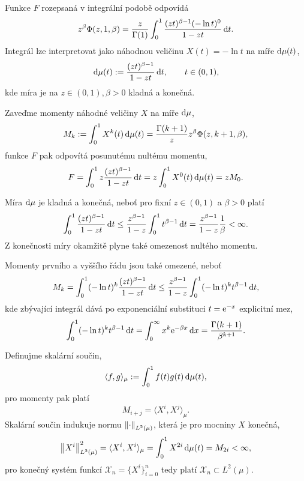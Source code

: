 Funkce $F$ rozepsaná v integrální podobě odpovídá
\begin{equation}
    z^\beta\Phi(z,1,\beta)=\frac{z}{\Gamma(1)}\int_0^1 \frac{(zt)^{\beta-1}(-\ln{t})^{0}}{1-zt}\,\mathrm{d}{t}.
\end{equation}
Integrál lze interpretovat jako náhodnou veličinu $X(t)=-\ln{t}$ na míře $\!\,\mathrm{d}{\mu}(t)$,
\begin{equation}
    \,\mathrm{d}{\mu}(t) := \frac{(zt)^{\beta-1}}{1-zt}\,\mathrm{d}{t},\qquad t\in(0,1),
\end{equation}
kde míra je na $z\in(0,1), \beta >0$ kladná a konečná.

Zaveďme momenty náhodné veličiny $X$ na míře $\!\,\mathrm{d}{\mu}$,
\begin{equation}\label{eq:def_moment}
    M_k:=\int_0^1X^k(t)\,\mathrm{d}{\mu}(t)=\frac{\Gamma(k+1)}{z}z^\beta \Phi(z,k+1,\beta),
\end{equation}
funkce $F$ pak odpovítá posunutému nultému momentu,
\begin{equation}\label{eq:F_as_moment}
    F=\int_0^1 z\frac{(zt)^{\beta-1}}{1-zt}\,\mathrm{d}{t}=z\int_0^1X^{0}(t)\,\mathrm{d}{\mu}(t)=zM_{0}.
\end{equation}

Míra $\!\,\mathrm{d}{\mu}$ je kladná a konečná, neboť pro fixní $z\in(0,1)$ a $\beta>0$ platí
\begin{equation}
    \int_0^1\frac{(zt)^{\beta-1}}{1-zt} \,\mathrm{d}{t} \leq \frac{z^{\beta-1}}{1-z}\int_0^1t^{\beta-1}\,\mathrm{d}{t}=\frac{z^{\beta-1}}{1-z}\frac{1}{\beta}<\infty.
\end{equation}
Z konečnosti míry okamžitě plyne také omezenost nultého momentu.

Momenty prvního a vyššího řádu jsou také omezené, neboť 
\begin{equation}
    M_k=\int_0^1(-\ln{t})^k\frac{(zt)^{\beta-1}}{1-zt}\,\mathrm{d}{t}\leq\frac{z^{\beta-1}}{1-z}\int_0^1(-\ln{t})^k t^{\beta-1}\,\mathrm{d}{t},
\end{equation}
kde zbývající integrál dává po exponenciální substituci $t=\mathrm{e}^{-x}$ explicitní mez,
\begin{equation}
    \int_0^1(-\ln{t})^k t^{\beta-1}\,\mathrm{d}{t}=\int_0^\infty x^k \mathrm{e}^{-\beta x} \,\mathrm{d}{x}=\frac{\Gamma(k+1)}{\beta^{k+1}}.
\end{equation}

Definujme skalární součin,
\begin{equation}
    \langle f,g\rangle_\mu:=\int_0^1f(t)g(t)\,\mathrm{d}{\mu}(t),
\end{equation}
pro momenty pak platí
\begin{equation}
    M_{i+j}=\langle X^i,X^j\rangle_\mu.
\end{equation}
Skalární součin indukuje normu $\left\lVert\cdot\right\rVert_{L^2(\mu)}$, která je pro mocniny $X$ konečná,
\begin{equation}
    \left\lVert X^i\right\rVert_{L^2(\mu)}^2=\langle X^i, X^i\rangle_\mu=\int_0^1 X^{2i}\,\mathrm{d}{\mu}(t)=M_{2i}<\infty,
\end{equation}
pro konečný systém funkcí $\mathcal{X}_n=\lbrace X^i\rbrace_{i=0}^{n}$ tedy platí $\mathcal{X}_n\subset L^2(\mu)$.

